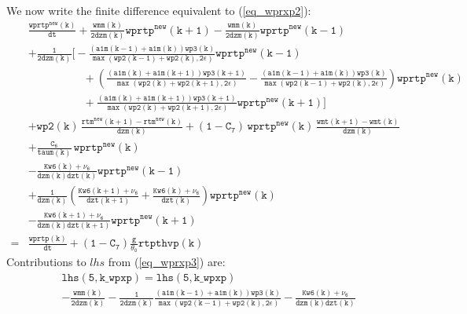 \documentclass[11pt,fleqn]{article}
\begin{document}
We now write
the finite difference equivalent to (\ref{eq_wprxp2}):
%
\begin{equation}
\label{eq_wprxp3}
\begin{split}
& \mathtt{
  \frac{wprtp^{new}(k)}{dt}
  + \frac{wmm(k)}{2 dzm(k)} wprtp^{new}(k+1)
  - \frac{wmm(k)}{2 dzm(k)} wprtp^{new}(k-1)
  } \\
& \mathtt{
  + \frac{1}{2 dzm(k)}
    \bigg[ -\frac{\left(a1m(k-1)+a1m(k)\right) wp3(k)}
                 {\max\left(wp2(k-1)+wp2(k),2\epsilon\right)}
            wprtp^{new}(k-1)
  } \\
& \mathtt{ \quad \quad \quad \quad \quad
          + \left( 
             \frac{\left(a1m(k)+a1m(k+1)\right) wp3(k+1)}
                 {\max\left(wp2(k)+wp2(k+1),2\epsilon\right)}
            -\frac{\left(a1m(k-1)+a1m(k)\right) wp3(k)}
                 {\max\left(wp2(k-1)+wp2(k),2\epsilon\right)}
            \right)
            wprtp^{new}(k)
  } \\
& \mathtt{ \quad \quad \quad \quad \quad
           + \frac{\left(a1m(k)+a1m(k+1)\right) wp3(k+1)}
                 {\max\left(wp2(k)+wp2(k+1),2\epsilon\right)}
            wprtp^{new}(k+1)
    \bigg]
  } \\
& \mathtt{
  + wp2(k) \, \frac{rtm^{new}(k+1)-rtm^{new}(k)}{dzm(k)}
  + (1-C_7) \, wprtp^{new}(k) \, \frac{wmt(k+1)-wmt(k)}{dzm(k)}
  } \\
& \mathtt{
  + \frac{C_6}{taum(k)} \, wprtp^{new}(k)
  } \\
& \mathtt{
  - \frac{Kw6(k)+\nu_6}{dzm(k)dzt(k)} wprtp^{new}(k-1)
  } \\
& \mathtt{
  + \frac{1}{dzm(k)} \left(   \frac{Kw6(k+1)+\nu_6}{dzt(k+1)}
                            + \frac{Kw6(k)+\nu_6}{dzt(k)} \right) wprtp^{new}(k)
  } \\
& \mathtt{
  - \frac{Kw6(k+1)+\nu_6}{dzm(k)dzt(k+1)} wprtp^{new}(k+1)
  } \\
=& \mathtt{ \frac{wprtp(k)}{dt} + (1-C_7) \frac{g}{\theta_0} rtpthvp(k) }
\end{split}
\end{equation}
%
Contributions to $lhs$ from (\ref{eq_wprxp3}) are:
%
\begin{equation}
\begin{split}
&  \mathtt{ lhs(5,k\_wpxp) = lhs(5,k\_wpxp) } \\
&  \mathtt{
- \frac{wmm(k)}{2 dzm(k)}
- \frac{1}{2 dzm(k)}
  \frac{\left(a1m(k-1)+a1m(k)\right) wp3(k)}
       {\max\left(wp2(k-1)+wp2(k),2\epsilon\right)}
- \frac{Kw6(k)+\nu_6}{dzm(k)dzt(k)}
  }
\end{split}
\end{equation}
\end{document}
